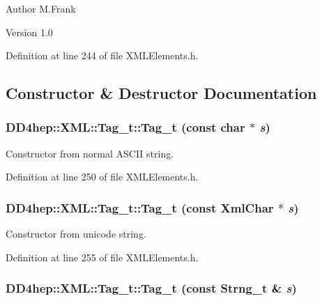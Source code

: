 \begin{DoxyAuthor}{Author}
M.Frank 
\end{DoxyAuthor}
\begin{DoxyVersion}{Version}
1.0 
\end{DoxyVersion}


Definition at line 244 of file XMLElements.h.

\subsection{Constructor \& Destructor Documentation}
\hypertarget{class_d_d4hep_1_1_x_m_l_1_1_tag__t_aa7b0da20ca009a5fb665c79ea660fbc3}{
\subsubsection[{Tag\_\-t}]{\setlength{\rightskip}{0pt plus 5cm}DD4hep::XML::Tag\_\-t::Tag\_\-t (const char $\ast$ {\em s})}}
\label{class_d_d4hep_1_1_x_m_l_1_1_tag__t_aa7b0da20ca009a5fb665c79ea660fbc3}


Constructor from normal ASCII string. 

Definition at line 250 of file XMLElements.h.\hypertarget{class_d_d4hep_1_1_x_m_l_1_1_tag__t_a1a301039b9be52aacf1927975c135131}{
\subsubsection[{Tag\_\-t}]{\setlength{\rightskip}{0pt plus 5cm}DD4hep::XML::Tag\_\-t::Tag\_\-t (const {\bf XmlChar} $\ast$ {\em s})}}
\label{class_d_d4hep_1_1_x_m_l_1_1_tag__t_a1a301039b9be52aacf1927975c135131}


Constructor from unicode string. 

Definition at line 255 of file XMLElements.h.\hypertarget{class_d_d4hep_1_1_x_m_l_1_1_tag__t_a9c6f70c4676068b78dd2d4e594d85162}{
\subsubsection[{Tag\_\-t}]{\setlength{\rightskip}{0pt plus 5cm}DD4hep::XML::Tag\_\-t::Tag\_\-t (const {\bf Strng\_\-t} \& {\em s})}}
\label{class_d_d4hep_1_1_x_m_l_1_1_tag__t_a9c6f70c4676068b78dd2d4e594d85162}


